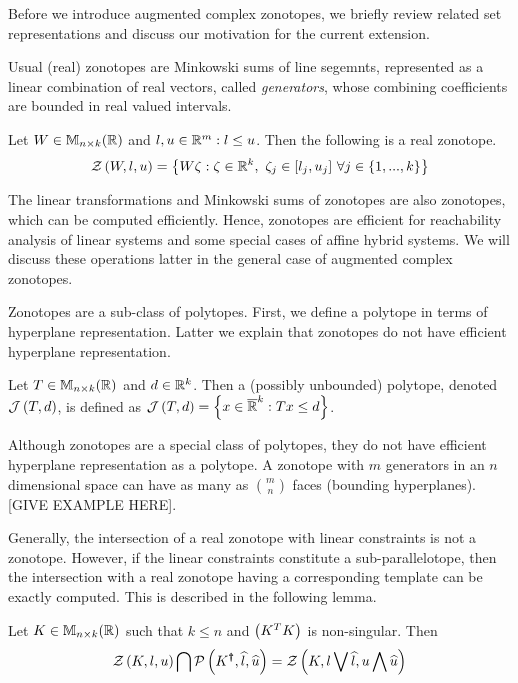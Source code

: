 
Before we introduce augmented complex zonotopes, we briefly review
related set representations and discuss our motivation for the
current extension.

Usual (real) zonotopes are Minkowski sums of
line segemnts, represented as a linear combination of real vectors,
called \emph{generators}, whose combining coefficients
are bounded in real valued intervals.
\begin{definition}
Let $W\in\mathbb{M}_{n\times k}(\mathbb{\mathbb{R}})$ and $l,u\in\mathbb{R}^m: l\leq u$.  Then the
following is a real zonotope.
\begin{equation*}
\mathcal{Z}\left(W,l,u\right) = \left\{W\zeta: \zeta\in\mathbb{R}^k,~\zeta_j\in[l_j,u_j]~\forall j\in \{1,...,k\}\right\}
\end{equation*}
\end{definition}
%
The linear transformations and Minkowski sums of zonotopes are also
zonotopes, which can be computed efficiently.  Hence, zonotopes are
efficient for reachability analysis of linear systems and some special
cases of affine hybrid systems.  We will discuss these operations
latter in the general case of augmented complex zonotopes.

Zonotopes are a sub-class of polytopes.  First, we define a polytope
in terms of hyperplane representation.  Latter we explain that
zonotopes do not have efficient hyperplane representation. 
%
\begin{definition}
Let $T\in\mathbb{M}_{n\times k}(\mathbb{\mathbb{R}})$ and $d\in\mathbb{R}^k$.  Then a (possibly
unbounded) polytope, denoted $\mathcal{J}\left(T,d\right)$, is defined as
$\mathcal{J}\left(T,d\right) = \left\{x\in\mathbb{\overline{R}}^k: Tx\leq d\right\}$.
\end{definition}
%
Although zonotopes are a special class of polytopes, they do not have
efficient hyperplane representation as a polytope.  A zonotope with
$m$ generators in an $n$ dimensional space can have as many as
${m}\choose{n}$ faces (bounding hyperplanes).  [GIVE EXAMPLE HERE].

Generally, the intersection of a real zonotope with linear constraints
is not a zonotope.  However, if the linear constraints constitute a
sub-parallelotope, then the intersection with a real zonotope having a
corresponding template can be exactly computed.  This is described in
the following lemma.
%
\begin{lemma}\label{lem:motivation}
Let $K\in\mathbb{M}_{n\times k}(\mathbb{R})$ such that $k\leq n$ and $\left(K^TK\right)$ is
non-singular.  Then
\[
\mathcal{Z}\left(K,l,u\right) \bigcap \mathcal{P}\left(K^{\bm{\dagger}},\widehat{l},\widehat{u}\right)
= \mathcal{Z}\left(K,l\bigvee \widehat{l},u\bigwedge \widehat{u}\right)
\]
\end{lemma}
%


